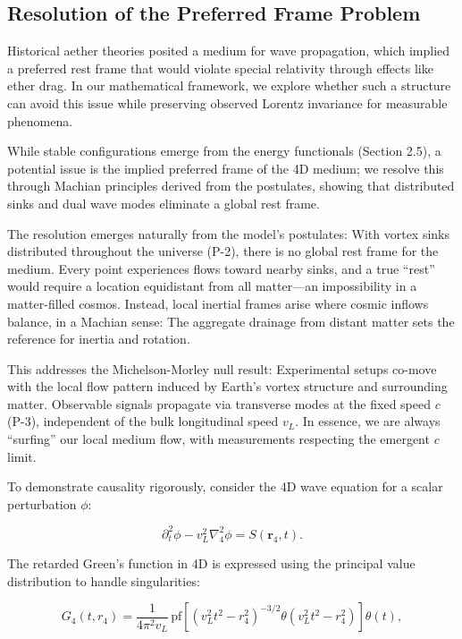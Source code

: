 \subsection{Resolution of the Preferred Frame Problem}

Historical aether theories posited a medium for wave propagation, which implied a preferred rest frame that would violate special relativity through effects like ether drag. In our mathematical framework, we explore whether such a structure can avoid this issue while preserving observed Lorentz invariance for measurable phenomena.

While stable configurations emerge from the energy functionals (Section 2.5), a potential issue is the implied preferred frame of the 4D medium; we resolve this through Machian principles derived from the postulates, showing that distributed sinks and dual wave modes eliminate a global rest frame.

The resolution emerges naturally from the model's postulates: With vortex sinks distributed throughout the universe (P-2), there is no global rest frame for the medium. Every point experiences flows toward nearby sinks, and a true ``rest'' would require a location equidistant from all matter---an impossibility in a matter-filled cosmos. Instead, local inertial frames arise where cosmic inflows balance, in a Machian sense: The aggregate drainage from distant matter sets the reference for inertia and rotation.

This addresses the Michelson-Morley null result: Experimental setups co-move with the local flow pattern induced by Earth's vortex structure and surrounding matter. Observable signals propagate via transverse modes at the fixed speed $c$ (P-3), independent of the bulk longitudinal speed $v_L$. In essence, we are always ``surfing'' our local medium flow, with measurements respecting the emergent $c$ limit.

To demonstrate causality rigorously, consider the 4D wave equation for a scalar perturbation $\phi$:

\begin{equation}
\partial_t^2 \phi - v_L^2 \nabla_4^2 \phi = S(\mathbf{r}_4, t).
\end{equation}

The retarded Green's function in 4D is expressed using the principal value distribution to handle singularities:

\begin{equation}
G_4(t, r_4) = \frac{1}{4 \pi^2 v_L} \, \text{pf} \left[ (v_L^2 t^2 - r_4^2)^{-3/2} \theta(v_L^2 t^2 - r_4^2) \right] \theta(t),
\end{equation}

